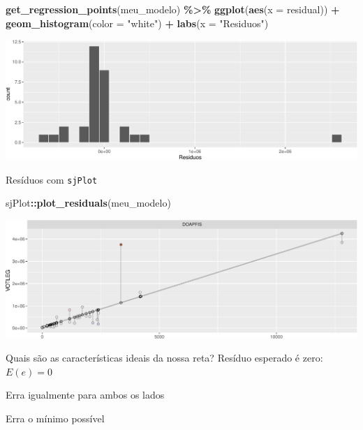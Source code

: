 \documentclass[
  9pt,
  ignorenonframetext,
  aspectratio=169]{beamer}
\newenvironment{Shaded}{\begin{snugshade}}{\end{snugshade}}
\newcommand{\DataTypeTok}[1]{\textcolor[rgb]{0.13,0.29,0.53}{#1}}
\newcommand{\KeywordTok}[1]{\textcolor[rgb]{0.13,0.29,0.53}{\textbf{#1}}}
\newcommand{\NormalTok}[1]{#1}
\newcommand{\OperatorTok}[1]{\textcolor[rgb]{0.81,0.36,0.00}{\textbf{#1}}}
\newcommand{\StringTok}[1]{\textcolor[rgb]{0.31,0.60,0.02}{#1}}
\begin{document}
\begin{frame}[fragile]{}
\protect\hypertarget{section-2}{}
\begin{Shaded}
\begin{Highlighting}[]
\KeywordTok{get\_regression\_points}\NormalTok{(meu\_modelo) }\OperatorTok{\%\textgreater{}\%}
\StringTok{  }\KeywordTok{ggplot}\NormalTok{(}\KeywordTok{aes}\NormalTok{(}\DataTypeTok{x =}\NormalTok{ residual)) }\OperatorTok{+}
\StringTok{  }\KeywordTok{geom\_histogram}\NormalTok{(}\DataTypeTok{color =} \StringTok{"white"}\NormalTok{) }\OperatorTok{+}
\StringTok{  }\KeywordTok{labs}\NormalTok{(}\DataTypeTok{x =} \StringTok{"Residuos"}\NormalTok{)}
\end{Highlighting}
\end{Shaded}

\includegraphics{aula_12_files/figure-beamer/unnamed-chunk-3-1.pdf}
\end{frame}

\begin{frame}[fragile]{Resíduos com \texttt{sjPlot}}
\protect\hypertarget{resuxedduos-com-sjplot}{}
\begin{Shaded}
\begin{Highlighting}[]
\NormalTok{sjPlot}\OperatorTok{::}\KeywordTok{plot\_residuals}\NormalTok{(meu\_modelo)}
\end{Highlighting}
\end{Shaded}

\includegraphics{aula_12_files/figure-beamer/unnamed-chunk-4-1.pdf}
\end{frame}

\begin{frame}{Quais são as características ideais da nossa reta?}
\protect\hypertarget{quais-suxe3o-as-caracteruxedsticas-ideais-da-nossa-reta}{}
Resíduo esperado é zero: \(E(e)=0\)

Erra igualmente para ambos os lados

Erra o mínimo possível
\end{frame}
\end{document}
